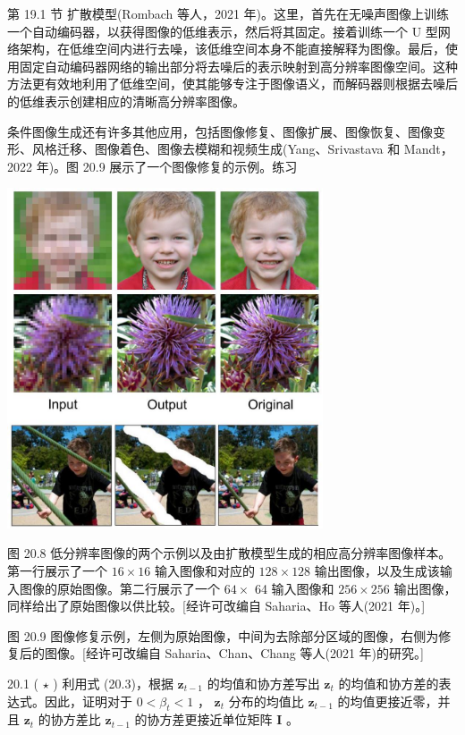 \documentclass[10pt]{report}
\begin{document}
第 19.1 节 扩散模型(Rombach 等人，2021 年)。这里，首先在无噪声图像上训练一个自动编码器，以获得图像的低维表示，然后将其固定。接着训练一个 U 型网络架构，在低维空间内进行去噪，该低维空间本身不能直接解释为图像。最后，使用固定自动编码器网络的输出部分将去噪后的表示映射到高分辨率图像空间。这种方法更有效地利用了低维空间，使其能够专注于图像语义，而解码器则根据去噪后的低维表示创建相应的清晰高分辨率图像。

条件图像生成还有许多其他应用，包括图像修复、图像扩展、图像恢复、图像变形、风格迁移、图像着色、图像去模糊和视频生成(Yang、Srivastava 和 Mandt，2022 年)。图 20.9 展示了一个图像修复的示例。练习

\begin{center}
\includegraphics[max width=0.7\textwidth]{images/0194e279-9b28-703a-88f4-c3ac21e2010d_622_688_348_868_936_0.jpg}
\end{center}
\hspace*{3em} 

图 20.8 低分辨率图像的两个示例以及由扩散模型生成的相应高分辨率图像样本。第一行展示了一个 \({16} \times  {16}\) 输入图像和对应的 \({128} \times  {128}\) 输出图像，以及生成该输入图像的原始图像。第二行展示了一个 \({64} \times\) 64 输入图像和 \({256} \times  {256}\) 输出图像，同样给出了原始图像以供比较。[经许可改编自 Saharia、Ho 等人(2021 年)。]

图 20.9 图像修复示例，左侧为原始图像，中间为去除部分区域的图像，右侧为修复后的图像。[经许可改编自 Saharia、Chan、Chang 等人(2021 年)的研究。]

20.1 ( \(\star\) ) 利用式 (20.3)，根据 \({\mathbf{z}}_{t - 1}\) 的均值和协方差写出 \({\mathbf{z}}_{t}\) 的均值和协方差的表达式。因此，证明对于 \(0 < {\beta }_{t} < 1\) ， \({\mathbf{z}}_{t}\) 分布的均值比 \({\mathbf{z}}_{t - 1}\) 的均值更接近零，并且 \({\mathbf{z}}_{t}\) 的协方差比 \({\mathbf{z}}_{t - 1}\) 的协方差更接近单位矩阵 \(\mathbf{I}\) 。
\end{document}
